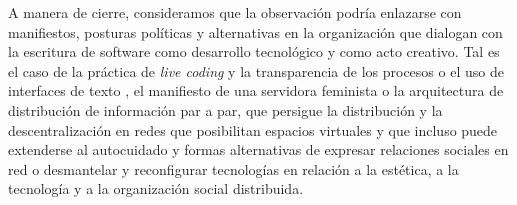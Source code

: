 
A manera de cierre, consideramos que la observación podría enlazarse con manifiestos, posturas políticas y alternativas en la organización que dialogan con la escritura de software como desarrollo tecnológico y como acto creativo. Tal es el caso de la práctica de \textit{live coding} y la transparencia de los procesos o el uso de interfaces de texto \citep{collinsLivecoding}, el manifiesto de una servidora feminista \citep{feministserver} o la arquitectura de distribución de información par a par, que persigue la distribución y la descentralización en redes que posibilitan espacios virtuales \citep{cyberspace} y que incluso puede extenderse al autocuidado y formas alternativas de expresar relaciones sociales en red \citep{dwc} o desmantelar y reconfigurar tecnologías en relación a la estética, a la tecnología y a la organización social distribuida. 













